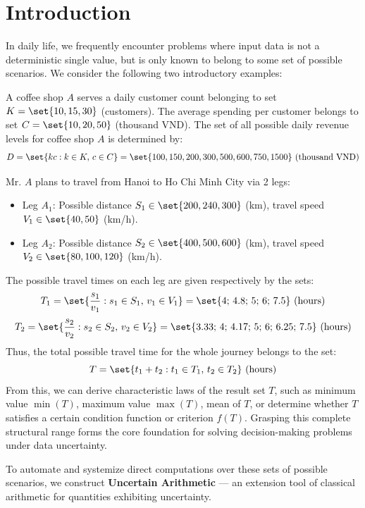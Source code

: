 \section{Introduction}
In daily life, we frequently encounter problems where input data is not a deterministic single value, but is only known to belong to some set of possible scenarios. We consider the following two introductory examples:

\begin{example}
	A coffee shop $A$ serves a daily customer count belonging to set $K = \set{10, 15, 30}$ (customers). The average spending per customer belongs to set $C = \set{10, 20, 50}$ (thousand VND). The set of all possible daily revenue levels for coffee shop $A$ is determined by:
	\[
	D = \set{kc : k \in K, \, c \in C} = \set{100, 150, 200, 300, 500, 600, 750, 1500} \text{ (thousand VND)}
	\]
\end{example}

\begin{example}
	Mr. $A$ plans to travel from Hanoi to Ho Chi Minh City via 2 legs:
	\begin{itemize}
		\item Leg $A_1$: Possible distance $S_1 \in \set{200, 240, 300}$ (km), travel speed $V_1 \in \set{40, 50}$ (km/h).
		\item Leg $A_2$: Possible distance $S_2 \in \set{400, 500, 600}$ (km), travel speed $V_2 \in \set{80, 100, 120}$ (km/h).
	\end{itemize}
	The possible travel times on each leg are given respectively by the sets:
	\[
	T_1 = \set{\frac{s_1}{v_1} : s_1 \in S_1, \, v_1 \in V_1} = \set{4; \, 4.8; \, 5; \, 6; \, 7.5} \text{ (hours)}
	\]
	\[
	T_2 = \set{\frac{s_2}{v_2} : s_2 \in S_2, \, v_2 \in V_2} = \set{3.33; \, 4; \, 4.17; \, 5; \, 6; \, 6.25; \, 7.5} \text{ (hours)}
	\]
	Thus, the total possible travel time for the whole journey belongs to the set:
	\[
	T = \set{t_1 + t_2 : t_1 \in T_1, \, t_2 \in T_2} \text{ (hours)}
	\]
	From this, we can derive characteristic laws of the result set $T$, such as minimum value $\min(T)$, maximum value $\max(T)$, mean of $T$, or determine whether $T$ satisfies a certain condition function or criterion $f(T)$. Grasping this complete structural range forms the core foundation for solving decision-making problems under data uncertainty.
\end{example}

To automate and systemize direct computations over these sets of possible scenarios, we construct \textbf{Uncertain Arithmetic} — an extension tool of classical arithmetic for quantities exhibiting uncertainty.
